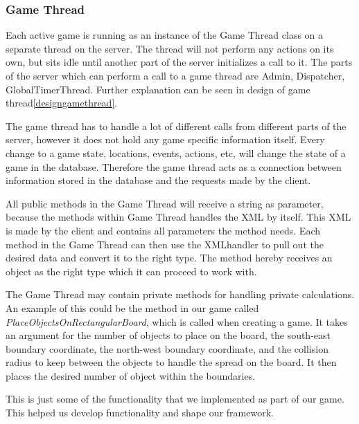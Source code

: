 \subsubsection{Game Thread}
\label{sec:gamethreadimpl}
Each active game is running as an instance of the Game Thread class on a separate thread on the server. The thread will not perform any actions on its own, but sits idle until another part of the server initializes a call to it. The parts of the server which can perform a call to a game thread are Admin, Dispatcher, GlobalTimerThread. Further explanation can be seen in design of game thread\ref{designgamethread}. 

The game thread has to handle a lot of different calls from different parts of the server, however it does not hold any game specific information itself. Every change to a game state, locations, events, actions, etc, will change the state of a game in the database. Therefore the game thread acts as a connection between information stored in the database and the requests made by the client.

All public methods in the Game Thread will receive a string as parameter, because the methods within Game Thread handles the XML by itself. This XML is made by the client and contains all parameters the method needs. Each method in the Game Thread can then use the XMLhandler to pull out the desired data and convert it to the right type. The method hereby receives an object as the right type which it can proceed to work with.

The Game Thread may contain private methods for handling private calculations. An example of this could be the  method in our game called \textit{PlaceObjectsOnRectangularBoard}, which is called when creating a game. It takes an argument for the number of objects to place on the board, the south-east boundary coordinate, the north-west boundary coordinate, and the collision radius to keep between the objects to handle the spread on the board. It then places the desired number of object within the boundaries.

This is just some of the functionality that we implemented as part of our game. This helped us develop functionality and shape our framework.